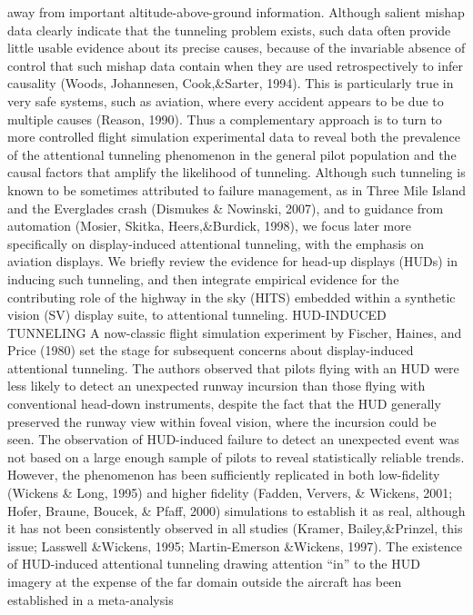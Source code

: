 \documentclass[utf8,bachelor,manualbib]{gradu3}
\begin{document}
away from important altitude-above-ground information.
Although salient mishap data clearly indicate that the tunneling problem exists,
such data often provide little usable evidence about its precise causes, because of
the invariable absence of control that such mishap data contain when they are used
retrospectively to infer causality (Woods, Johannesen, Cook,\&Sarter, 1994). This
is particularly true in very safe systems, such as aviation, where every accident appears
to be due to multiple causes (Reason, 1990). Thus a complementary approach
is to turn to more controlled flight simulation experimental data to reveal
both the prevalence of the attentional tunneling phenomenon in the general pilot
population and the causal factors that amplify the likelihood of tunneling. Although
such tunneling is known to be sometimes attributed to failure management,
as in Three Mile Island and the Everglades crash (Dismukes \& Nowinski, 2007),
and to guidance from automation (Mosier, Skitka, Heers,\&Burdick, 1998), we focus
later more specifically on display-induced attentional tunneling, with the emphasis
on aviation displays. We briefly review the evidence for head-up displays
(HUDs) in inducing such tunneling, and then integrate empirical evidence for the
contributing role of the highway in the sky (HITS) embedded within a synthetic vision
(SV) display suite, to attentional tunneling.
HUD-INDUCED TUNNELING
A now-classic flight simulation experiment by Fischer, Haines, and Price (1980)
set the stage for subsequent concerns about display-induced attentional tunneling. The authors observed that pilots flying with an HUD were less likely to detect an
unexpected runway incursion than those flying with conventional head-down instruments,
despite the fact that the HUD generally preserved the runway view
within foveal vision, where the incursion could be seen. The observation of
HUD-induced failure to detect an unexpected event was not based on a large
enough sample of pilots to reveal statistically reliable trends. However, the phenomenon
has been sufficiently replicated in both low-fidelity (Wickens \& Long,
1995) and higher fidelity (Fadden, Ververs, \& Wickens, 2001; Hofer, Braune,
Boucek, \& Pfaff, 2000) simulations to establish it as real, although it has not been
consistently observed in all studies (Kramer, Bailey,\&Prinzel, this issue; Lasswell
\&Wickens, 1995; Martin-Emerson \&Wickens, 1997). The existence of HUD-induced
attentional tunneling drawing attention “in” to the HUD imagery at the expense
of the far domain outside the aircraft has been established in a meta-analysis
\end{document}
